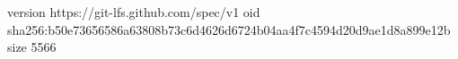 version https://git-lfs.github.com/spec/v1
oid sha256:b50e73656586a63808b73c6d4626d6724b04aa4f7c4594d20d9ae1d8a899e12b
size 5566

